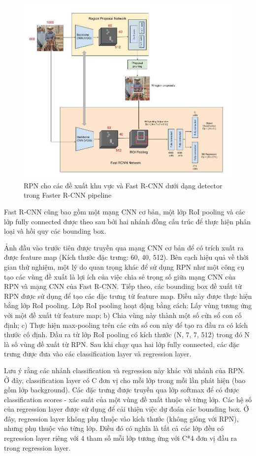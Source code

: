 \graphicspath{{figures/}}
\begin{figure}[h!]
  \centering
  \includegraphics[scale=0.42]{graphics/fasterrcnn.jpeg}
  \caption{RPN cho các đề xuất khu vực và Fast R-CNN dưới dạng detector trong Faster R-CNN pipeline}
\end{figure}

Fast R-CNN cũng bao gồm một mạng CNN cơ bản, một lớp RoI pooling và các lớp fully connected được theo sau bởi hai nhánh đồng cấu trúc để thực hiện phân loại và hồi quy các bounding box.

Ảnh đầu vào trước tiên được truyền qua mạng CNN cơ bản để có trích xuất ra được feature map (Kích thước đặc trưng: 60, 40, 512). Bên cạch hiệu quả về thời gian thử nghiệm, một lý do quan trọng khác để sử dụng RPN như một công cụ tạo các vùng đề xuất là lợi ích của việc chia sẻ trọng số giữa mạng CNN của RPN và mạng CNN của Fast R-CNN.
Tiếp theo, các bounding box đề xuất từ RPN được sử dụng để tạo các đặc trưng từ feature map. Điều này được thực hiện bằng lớp RoI pooling. Lớp RoI pooling hoạt động bằng cách: Lấy vùng tương ứng với một đề xuất từ feature map; b) Chia vùng này thành một số cửa sổ con cố định; c) Thực hiện max-pooling trên các cửa sổ con này để tạo ra đầu ra có kích thước cố định.
Đầu ra từ lớp RoI pooling có kích thước (N, 7, 7, 512) trong đó N là số vùng đề xuất từ RPN. Sau khi chạy qua hai lớp fully connected, các đặc trưng được đưa vào các classification layer và regression layer.

Lưu ý rằng các nhánh classification và regression này khác với nhánh của RPN. Ở đây, classification layer có C đơn vị cho mỗi lớp trong mỗi lần phát hiện (bao gồm lớp background). Các đặc trưng được truyền qua lớp softmax để có được classification scores - xác suất của một vùng đề xuất thuộc về từng lớp. Các hệ số của regression layer được sử dụng để cải thiện việc dự đoán các bounding box. Ở đây, regression layer không phụ thuộc vào kích thước (không giống với RPN), nhưng phụ thuộc vào từng lớp. Điều đó có nghĩa là tất cả các lớp đều có regression layer riêng với 4 tham số mỗi lớp tương ứng với C*4 đơn vị đầu ra trong regression layer.

